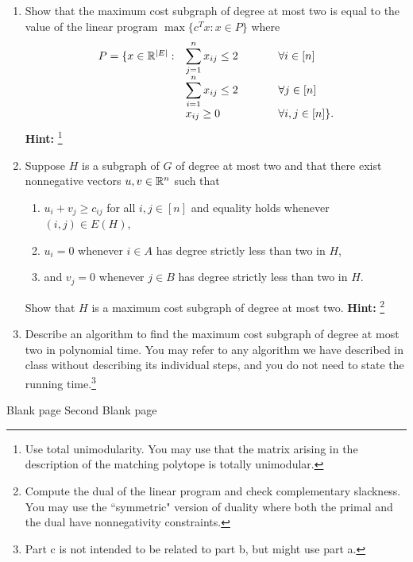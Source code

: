 \documentclass[12pt]{article}
\begin{document}
\begin{enumerate}
\begin{enumerate}
\item Show that the maximum cost subgraph of degree at most two is equal to the value of the linear program $\max\{c^T x: x \in P\}$ where $$ \begin{array}{ll@{\hspace{0.5in}}l}
P=\{ x\in \R^{|E|}: & \displaystyle \sum_{j =1}^n x_{ij}
\leq 2 & \forall i \in [n] \\
& \displaystyle \sum_{i = 1}^n x_{ij}
\leq 2 & \forall j \in [n] \\
 & x_{ij}\geq 0 & \forall i, j \in [n] \}. \end{array}$$
 \textbf{Hint: }\footnote{Use total unimodularity. You may use that the matrix arising in the description of the matching polytope is totally unimodular.}
 \item Suppose $H$ is a subgraph of $G$ of degree at most two and that there exist nonnegative vectors $u,v \in {\mathbb R}^n$ such that
 \begin{enumerate}
 \item $u_i + v_j \geq c_{ij}$ for all $i,j \in [n]$ and equality holds whenever $(i,j) \in E(H)$,
 \item $u_i = 0$ whenever $i \in A$ has degree strictly less than two in $H$,
 \item and $v_j = 0$ whenever $j \in B$ has degree strictly less than two in $H$.
 \end{enumerate}
 Show that $H$ is a maximum cost subgraph of degree at most two. \textbf{Hint: }\footnote{Compute the dual of the linear program and check complementary slackness. You may use the ``symmetric" version of duality where both the primal and the dual have nonnegativity constraints.}
\item Describe an algorithm to find the maximum cost subgraph of degree at most two in polynomial time. You may refer to any algorithm we have described in class without describing its individual steps, and you do not need to state the running time.\footnote{Part c is not intended to be related to part b, but might use part a.}
\end{enumerate}

\newpage
Blank page
\newpage
Second Blank page
\newpage



\end{enumerate}
\end{document}
